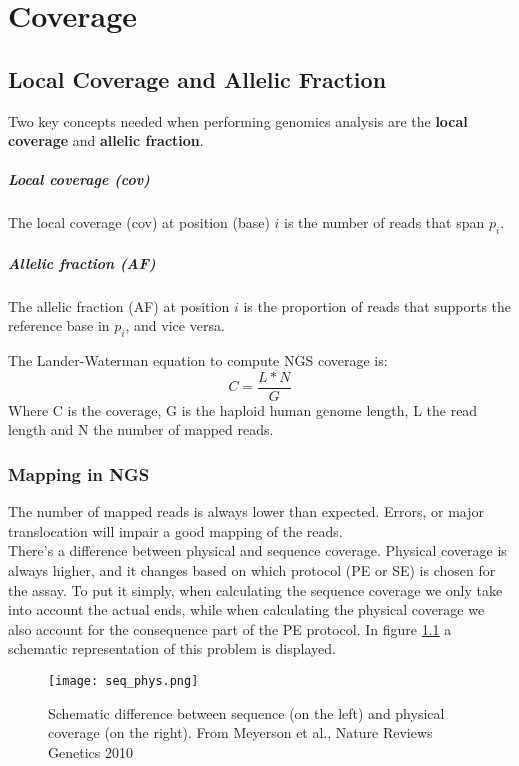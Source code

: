 \graphicspath{{chapters/02/}}
\chapter{Coverage}
\section{Local Coverage and Allelic Fraction}
Two key concepts needed when performing genomics analysis are the \textbf{local coverage} and \textbf{allelic fraction}.

	\paragraph*{Local coverage (cov)}
		The local coverage (cov) at position (base) $i$ is the number of reads that span $p_i$.
	\paragraph*{Allelic fraction (AF)}
		The allelic fraction (AF) at position $i$ is the proportion of reads that supports 			the reference base in $p_i$, and vice versa.

The Lander-Waterman equation to compute NGS coverage is:
\begin{equation}
C = \frac{L * N}{G}
\end{equation}
Where C is the coverage, G is the haploid human genome length, L the read length and N the number of mapped reads.

\subsection{Mapping in NGS}
The number of mapped reads is always lower than expected. Errors, or major translocation will impair a good mapping of the reads. \\
There's a difference between physical and sequence coverage. Physical coverage is always higher, and it changes based on which protocol (PE or SE) is chosen for the assay.
To put it simply, when calculating the sequence coverage we only take into account the actual ends, while when calculating the physical coverage we also account for the consequence part of the PE protocol. In figure \ref{fig:seq_phys} a  schematic representation of this problem is displayed.
\begin{figure}[H]
    \centering
    \texttt{[image: seq\_phys.png]}
    \caption{Schematic difference between sequence (on the left) and physical coverage (on the right). From Meyerson et al., Nature Reviews Genetics 2010}
    \label{fig:seq_phys}
\end{figure}

